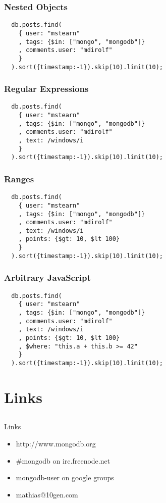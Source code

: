 \documentclass{beamer}
\begin{document}
\begin{frame}[fragile]
  \frametitle{Nested Objects}

  \begin{verbatim}
  db.posts.find(
    { user: "mstearn"
    , tags: {$in: ["mongo", "mongodb"]}
    , comments.user: "mdirolf"
    }
  ).sort({timestamp:-1}).skip(10).limit(10);
  \end{verbatim}
  
\end{frame}
\begin{frame}[fragile]
  \frametitle{Regular Expressions}

  \begin{verbatim}
  db.posts.find(
    { user: "mstearn"
    , tags: {$in: ["mongo", "mongodb"]}
    , comments.user: "mdirolf"
    , text: /windows/i
    }
  ).sort({timestamp:-1}).skip(10).limit(10);
  \end{verbatim}
  
\end{frame}
\begin{frame}[fragile]
  \frametitle{Ranges}

  \begin{verbatim}
  db.posts.find(
    { user: "mstearn"
    , tags: {$in: ["mongo", "mongodb"]}
    , comments.user: "mdirolf"
    , text: /windows/i
    , points: {$gt: 10, $lt 100}
    }
  ).sort({timestamp:-1}).skip(10).limit(10);
  \end{verbatim}
  
\end{frame}
\begin{frame}[fragile]
  \frametitle{Arbitrary JavaScript}

  \begin{verbatim}
  db.posts.find(
    { user: "mstearn"
    , tags: {$in: ["mongo", "mongodb"]}
    , comments.user: "mdirolf"
    , text: /windows/i
    , points: {$gt: 10, $lt 100}
    , $where: "this.a + this.b >= 42"
    }
  ).sort({timestamp:-1}).skip(10).limit(10);
  \end{verbatim}
\end{frame}

\section{Links}
\subsection{}

\begin{frame}{Links}
  \begin{itemize}
    \item http://www.mongodb.org
    \item \#mongodb on irc.freenode.net
    \item mongodb-user on google groups
    \item mathias@10gen.com
  \end{itemize}
\end{frame}
\end{document}
